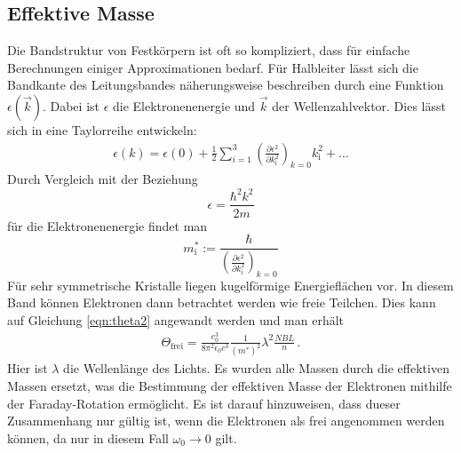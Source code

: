 \subsection{Effektive Masse}
\label{subsec:effmass}
Die Bandstruktur von Festkörpern ist oft so kompliziert, dass für einfache Berechnungen
einiger Approximationen bedarf. Für Halbleiter lässt sich die Bandkante des Leitungsbandes
näherungsweise beschreiben durch eine Funktion $\epsilon(\vec{k})$. Dabei ist
$\epsilon$ die Elektronenenergie und $\vec{k}$ der Wellenzahlvektor. Dies lässt sich
in eine Taylorreihe entwickeln:
\begin{align}
  \epsilon(k) = \epsilon (0) + \frac{1}{2} \sum_{i=1}^3 \left(\frac{\partial \epsilon^2}{\partial k^2_{\mathrm{i}}}\right)_{k=0} k_{\mathrm{i}}^2 + ...
  \label{eqn:taylor}
\end{align}
Durch Vergleich mit der Beziehung
\begin{equation}
  \epsilon = \frac{\hbar^2 k^2}{2m}
  \label{eqn:elektronenergie}
\end{equation}
für die Elektronenenergie findet man
\begin{equation}
   m^*_{\mathrm{i}} := \frac{\hbar}{\left(\frac{\partial \epsilon^2}{\partial k^2_{\mathrm{i}}}\right)_{k=0}}
   \label{eqn:effmass}
\end{equation}
Für sehr symmetrische Kristalle liegen kugelförmige Energieflächen vor. In diesem
Band können Elektronen dann betrachtet werden wie freie Teilchen. Dies kann auf
Gleichung \ref{eqn:theta2} angewandt werden und man erhält
\begin{align}
  \Theta_{\mathrm{frei}} = \frac{e^3_0}{8 \pi^2 \epsilon_0 c^3}\frac{1}{\left(m^{*}\right)^2} \lambda^2 \frac{NBL}{n} \,.
  \label{eqn:theta}
\end{align}
Hier ist $\lambda$ die Wellenlänge des Lichts. Es wurden alle Massen durch die effektiven
Massen ersetzt, was die Bestimmung der effektiven Masse der Elektronen mithilfe der
Faraday-Rotation ermöglicht. Es ist darauf hinzuweisen, dass dueser Zusammenhang nur
gültig ist, wenn die Elektronen als frei angenommen werden können, da nur in diesem
Fall $\omega_0 \rightarrow 0$ gilt.
